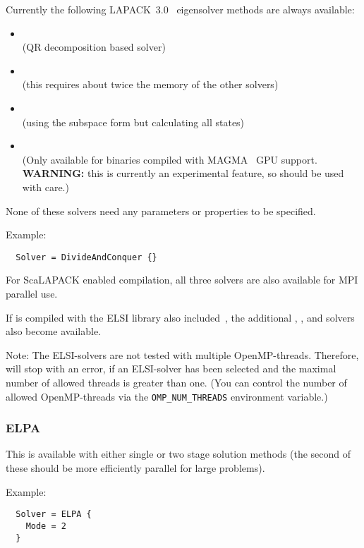 Currently the following LAPACK~3.0~\cite{lapack3} eigensolver methods are always
available:
\begin{itemize}
\item {}\\ (QR decomposition based solver)
\item {}\\ (this requires about twice the memory of the
  other solvers)
\item {}\\ (using the subspace form but calculating all
  states)
\item {}\\ (Only available for \dftbp{} binaries compiled with
  MAGMA~\cite{tdb10, tnld10, dghklty14} GPU support. \textbf{WARNING:} this is
  currently an experimental feature, so should be used with care.)
\end{itemize}
None of these solvers need any parameters or properties to be specified.

Example:\invparskip
\begin{verbatim}
  Solver = DivideAndConquer {}
\end{verbatim}

For ScaLAPACK enabled compilation, all three solvers are also available for MPI
parallel use.

If {\dftbp} is compiled with the ELSI library also included~\cite{YU2018267},
the additional , ,  and  solvers also
become available.

Note: The ELSI-solvers are not tested with multiple OpenMP-threads. Therefore,
{\dftbp} will stop with an error, if an ELSI-solver has been selected and the
maximal number of allowed threads is greater than one. (You can control the
number of allowed OpenMP-threads via the \verb|OMP_NUM_THREADS| environment
variable.)

\subsubsection{ELPA}

This is available with either single or two stage solution methods (the second
of these should be more efficiently parallel for large problems).

Example:\invparskip
\begin{verbatim}
  Solver = ELPA {
    Mode = 2
  }
\end{verbatim}


